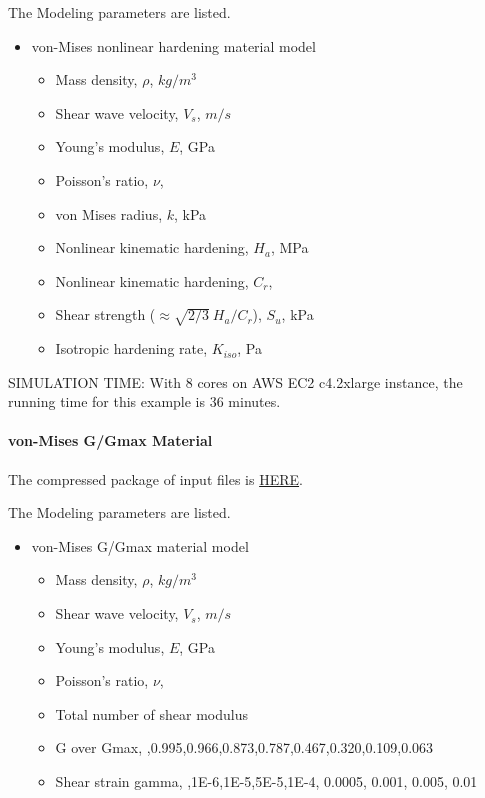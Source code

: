 The Modeling parameters are listed.
\begin{itemize}
  \item von-Mises nonlinear hardening material model 
  \begin{itemize}
    \item Mass density, $\rho$, \enspace {} $kg/m^3$
    \item Shear wave velocity, $V_s$, \enspace {} $m/s$
    \item Young's modulus, $E$, \enspace {} GPa
    \item Poisson's ratio, $\nu$, \enspace {}
    \item von Mises radius, $k$, \enspace {} kPa
    \item Nonlinear kinematic hardening, $H_a$, \enspace {} MPa
    \item Nonlinear kinematic hardening, $C_r$, \enspace {}
    \item Shear strength ($\approx \sqrt{2/3}\ {H_a/C_r} $), $S_u$, \enspace {} kPa
    \item Isotropic hardening rate, $K_{iso}$, \enspace {} Pa
  \end{itemize}
\end{itemize}


SIMULATION TIME: With 8 cores on AWS EC2 c4.2xlarge instance, the running time for this example is 36 minutes.


\paragraph{von-Mises G/Gmax Material}
The compressed package of input files is  
\href{https://github.com/yuan-energy/Real-ESSI-Short-Course-Examples/tree/master/short-course-examples/nonlinear_analysis_steps/soil-foundation/vonMisesGoverGmax/vonMisesGoverGmax.tgz?raw=true}{HERE}. 

The Modeling parameters are listed.
\begin{itemize}
  \item von-Mises G/Gmax material model 
  \begin{itemize}
    \item Mass density, $\rho$, \enspace {} $kg/m^3$
    \item Shear wave velocity, $V_s$, \enspace {} $m/s$
    \item Young's modulus, $E$, \enspace {} GPa
    \item Poisson's ratio, $\nu$, \enspace {}
    \item Total number of shear modulus \enspace {}
    \item G over Gmax, \enspace {},0.995,0.966,0.873,0.787,0.467,0.320,0.109,0.063
    \item Shear strain gamma, \enspace {},1E-6,1E-5,5E-5,1E-4, 0.0005, 0.001, 0.005, 0.01
  \end{itemize}
\end{itemize}

